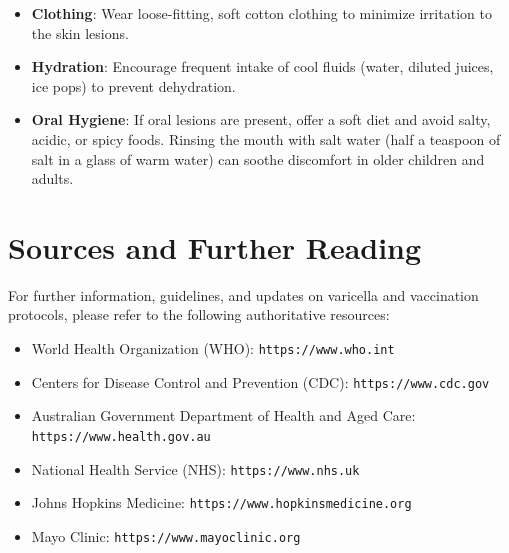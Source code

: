 \begin{itemize}
\begin{itemize}
        \item \textbf{Clothing}: Wear loose-fitting, soft cotton clothing to minimize irritation to the skin lesions.
        \item \textbf{Hydration}: Encourage frequent intake of cool fluids (water, diluted juices, ice pops) to prevent dehydration.
        \item \textbf{Oral Hygiene}: If oral lesions are present, offer a soft diet and avoid salty, acidic, or spicy foods. Rinsing the mouth with salt water (half a teaspoon of salt in a glass of warm water) can soothe discomfort in older children and adults.
    \end{itemize}
\end{itemize}

\section*{Sources and Further Reading}
For further information, guidelines, and updates on varicella and vaccination protocols, please refer to the following authoritative resources:

\begin{itemize}
    \item World Health Organization (WHO): \texttt{https://www.who.int}
    \item Centers for Disease Control and Prevention (CDC): \texttt{https://www.cdc.gov}
    \item Australian Government Department of Health and Aged Care: \texttt{https://www.health.gov.au}
    \item National Health Service (NHS): \texttt{https://www.nhs.uk}
    \item Johns Hopkins Medicine: \texttt{https://www.hopkinsmedicine.org}
    \item Mayo Clinic: \texttt{https://www.mayoclinic.org}
\end{itemize}